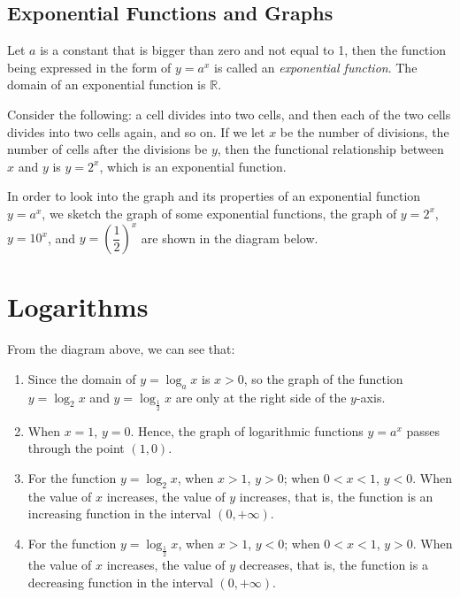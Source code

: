 \documentclass[12pt]{report}
\begin{document}
\subsection*{Exponential Functions and Graphs}

Let $a$ is a constant that is bigger than zero and not equal to 1, then the
function being expressed in the form of $y = a^x$ is called an
\emph{exponential function}. The domain of an exponential function is
$\mathbb{R}$.

Consider the following: a cell divides into two cells, and then each of the two
cells divides into two cells again, and so on. If we let $x$ be the number of
divisions, the number of cells after the divisions be $y$, then the functional
relationship between $x$ and $y$ is $y = 2^x$, which is an exponential
function.

In order to look into the graph and its properties of an exponential function
$y = a^x$, we sketch the graph of some exponential functions, the graph of $y =
  2^x$, $y = 10^x$, and $y = \left(\dfrac{1}{2}\right)^x$ are shown in the
diagram below.

\section{Logarithms}

From the diagram above, we can see that:
\begin{enumerate}[label=(\arabic*)]
  \item Since the domain of $y = \log_a x$ is $x > 0$, so the graph of the function $y
          = \log_2 x$ and $y = \log_\frac{1}{2} x$ are only at the right side of the
        $y$-axis.
  \item When $x = 1$, $y = 0$. Hence, the graph of logarithmic functions $y = a^x$
        passes through the point $(1, 0)$.

  \item For the function $y = \log_2 x$, when $x > 1$, $y > 0$; when $0 < x < 1$, $y <
          0$. When the value of $x$ increases, the value of $y$ increases, that is, the
        function is an increasing function in the interval $(0, +\infty)$.

  \item For the function $y = \log_\frac{1}{2} x$, when $x > 1$, $y < 0$; when $0 < x <
          1$, $y > 0$. When the value of $x$ increases, the value of $y$ decreases, that
        is, the function is a decreasing function in the interval $(0, +\infty)$.
\end{enumerate}
\end{document}
